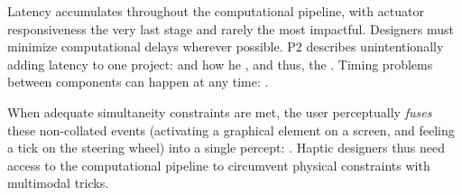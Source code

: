 Latency accumulates throughout the computational pipeline, with actuator responsiveness the very last stage and rarely the most impactful.
Designers must minimize computational delays wherever possible.
P2 describes unintentionally adding latency to one project:  and how he
, and thus, the .
Timing problems between components can happen at any time:
.




%
When adequate simultaneity constraints are met, the user perceptually \emph{fuses} these non-collated events (activating a graphical element on a screen, and feeling a tick on the steering wheel) into a single percept:
.
Haptic designers thus need access to the computational pipeline to circumvent physical constraints with multimodal tricks.

